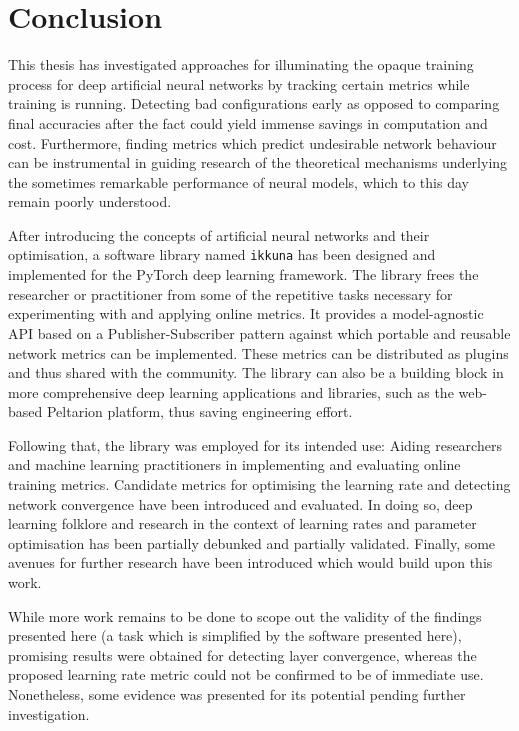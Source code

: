 \chapter{Conclusion}%

This thesis has investigated approaches for illuminating the opaque training
process for deep artificial neural networks by tracking certain metrics while
training is running. Detecting bad configurations early as opposed to comparing
final accuracies after the fact could yield immense savings in computation and
cost.  Furthermore, finding metrics which predict undesirable network behaviour
can be instrumental in guiding research of the theoretical mechanisms underlying
the sometimes remarkable performance of neural models, which to this day remain
poorly understood.

After introducing the concepts of artificial neural networks and their
optimisation, a software library named \texttt{ikkuna} has been designed and
implemented for the PyTorch deep learning framework.  The library frees the
researcher or practitioner from some of the repetitive tasks necessary for
experimenting with and applying online metrics.  It provides a model-agnostic
API based on a Publisher-Subscriber pattern against which portable and reusable
network metrics can be implemented. These metrics can be distributed as plugins
and thus shared with the community. The library can also be a building block in
more comprehensive deep learning applications and libraries, such as the
web-based Peltarion platform, thus saving engineering effort.

Following that, the library was employed for its intended use: Aiding
researchers and machine learning practitioners in implementing and evaluating
online training metrics.  Candidate metrics for optimising the learning rate and
detecting network convergence have been introduced and evaluated. In doing so,
deep learning folklore and research in the context of learning rates and
parameter optimisation has been partially debunked and partially validated.
Finally, some avenues for further research have been introduced which would
build upon this work.

While more work remains to be done to scope out the validity of the findings
presented here (a task which is simplified by the software presented here),
promising results were obtained for detecting layer convergence, whereas the
proposed learning rate metric could not be confirmed to be of immediate use.
Nonetheless, some evidence was presented for its potential pending further
investigation.

